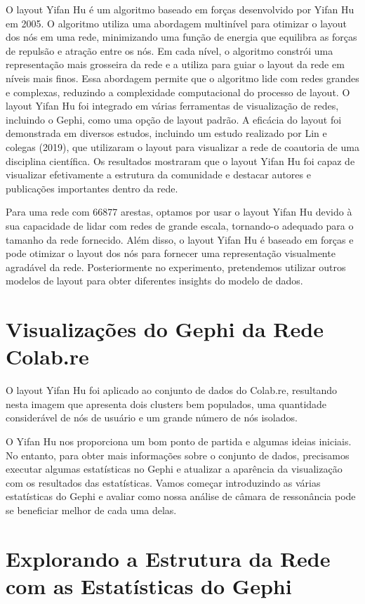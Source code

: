 O layout Yifan Hu é um algoritmo baseado em forças desenvolvido por Yifan Hu em 2005. O algoritmo utiliza uma abordagem multinível para otimizar o layout dos nós em uma rede, minimizando uma função de energia que equilibra as forças de repulsão e atração entre os nós. Em cada nível, o algoritmo constrói uma representação mais grosseira da rede e a utiliza para guiar o layout da rede em níveis mais finos. Essa abordagem permite que o algoritmo lide com redes grandes e complexas, reduzindo a complexidade computacional do processo de layout. O layout Yifan Hu foi integrado em várias ferramentas de visualização de redes, incluindo o Gephi, como uma opção de layout padrão. A eficácia do layout foi demonstrada em diversos estudos, incluindo um estudo realizado por Lin e colegas (2019), que utilizaram o layout para visualizar a rede de coautoria de uma disciplina científica. Os resultados mostraram que o layout Yifan Hu foi capaz de visualizar efetivamente a estrutura da comunidade e destacar autores e publicações importantes dentro da rede.

Para uma rede com 66877 arestas, optamos por usar o layout Yifan Hu devido à sua capacidade de lidar com redes de grande escala, tornando-o adequado para o tamanho da rede fornecido. Além disso, o layout Yifan Hu é baseado em forças e pode otimizar o layout dos nós para fornecer uma representação visualmente agradável da rede. Posteriormente no experimento, pretendemos utilizar outros modelos de layout para obter diferentes insights do modelo de dados.

\section{Visualizações do Gephi da Rede Colab.re}

O layout Yifan Hu foi aplicado ao conjunto de dados do Colab.re, resultando nesta imagem que apresenta dois clusters bem populados, uma quantidade considerável de nós de usuário e um grande número de nós isolados.

O Yifan Hu nos proporciona um bom ponto de partida e algumas ideias iniciais. No entanto, para obter mais informações sobre o conjunto de dados, precisamos executar algumas estatísticas no Gephi e atualizar a aparência da visualização com os resultados das estatísticas. Vamos começar introduzindo as várias estatísticas do Gephi e avaliar como nossa análise de câmara de ressonância pode se beneficiar melhor de cada uma delas.

\section{Explorando a Estrutura da Rede com as Estatísticas do Gephi}

